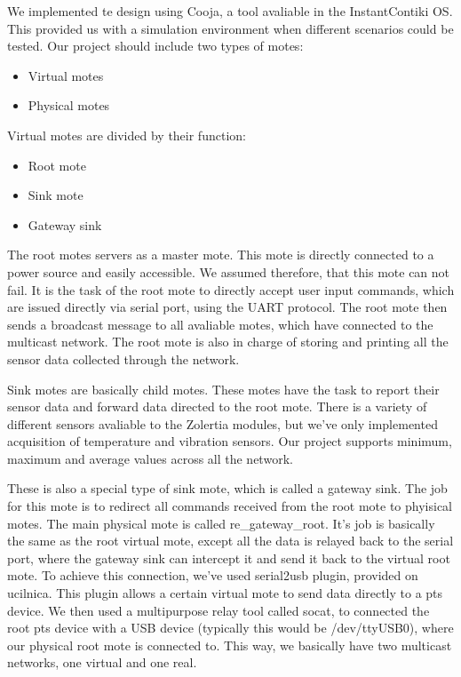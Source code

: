 \documentclass[a4paper]{article}
\begin{document}
We implemented te design using Cooja, a tool avaliable in the InstantContiki OS. This provided us with a simulation environment when different scenarios could be tested. Our project should include two types of motes:
\begin{itemize}
\item Virtual motes
\item Physical motes
\end{itemize}
Virtual motes are divided by their function:
\begin{itemize}
\item Root mote
\item Sink mote
\item Gateway sink
\end{itemize}
The root motes servers as a master mote. This mote is directly connected to a power source and easily accessible. We assumed therefore, that this mote can not fail. It is the task of the root mote to directly accept user input commands, which are issued directly via serial port, using the UART protocol. The root mote then sends a broadcast message to all avaliable motes, which have connected to the multicast network. The root mote is also in charge of storing and printing all the sensor data collected through the network.

Sink motes are basically child motes. These motes have the task to report their sensor data and forward data directed to the root mote. There is a variety of different sensors avaliable to the Zolertia modules, but we've only implemented acquisition of temperature and vibration sensors. Our project supports minimum, maximum and average values across all the network.

These is also a special type of sink mote, which is called a gateway sink. The job for this mote is to redirect all commands received from the root mote to phyisical motes. The main physical mote is called re\_gateway\_root. It's job is basically the same as the root virtual mote, except all the data is relayed back to the serial port, where the gateway sink can intercept it and send it back to the virtual root mote. To achieve this connection, we've used serial2usb plugin, provided on ucilnica. This plugin allows a certain virtual mote to send data directly to a pts device. We then used a multipurpose relay tool called socat, to connected the root pts device with a USB device (typically this would be /dev/ttyUSB0), where our physical root mote is connected to. This way, we basically have two multicast networks, one virtual and one real.
\newline
\newline
\end{document}
